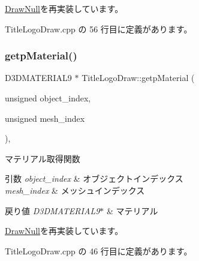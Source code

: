 \mbox{\hyperlink{class_draw_null_a98cc7cd43b19d9d70cc621d23d89286f}{Draw\+Null}}を再実装しています。



 Title\+Logo\+Draw.\+cpp の 56 行目に定義があります。

\mbox{\label{class_title_logo_draw_aafb35175c0ffe60c7a3facf7f9cda2f2}} 
\subsubsection{\texorpdfstring{getp\+Material()}{getpMaterial()}}
{\footnotesize\ttfamily D3\+D\+M\+A\+T\+E\+R\+I\+A\+L9 $\ast$ Title\+Logo\+Draw\+::getp\+Material (\begin{DoxyParamCaption}\item[{unsigned}]{object\+\_\+index,  }\item[{unsigned}]{mesh\+\_\+index }\end{DoxyParamCaption})\hspace{0.3cm}{\ttfamily [override]}, {\ttfamily [virtual]}}



マテリアル取得関数 


\begin{DoxyParams}{引数}
{\em object\+\_\+index} & オブジェクトインデックス \\
\hline
{\em mesh\+\_\+index} & メッシュインデックス \\
\hline
\end{DoxyParams}

\begin{DoxyRetVals}{戻り値}
{\em D3\+D\+M\+A\+T\+E\+R\+I\+A\+L9$\ast$} & マテリアル \\
\hline
\end{DoxyRetVals}


\mbox{\hyperlink{class_draw_null_a0c1efe55fea325ad277594be6fe1e938}{Draw\+Null}}を再実装しています。



 Title\+Logo\+Draw.\+cpp の 46 行目に定義があります。

\mbox{\label{class_title_logo_draw_a34fa4366f1ff190a08a36f8e402f6941}} 
